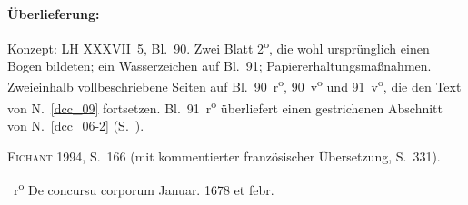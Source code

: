 %
%
%
%
%
\frenchspacing%
%
\begin{ledgroupsized}[r]{120mm}%
\footnotesize%
\pstart%
\noindent%
\textbf{Überlieferung:}%
\pend%
\end{ledgroupsized}%
\begin{ledgroupsized}[r]{114mm}%
\footnotesize%
\pstart%
\parindent -6mm%
%
Konzept:
LH XXXVII~5, Bl.~90.
Zwei Blatt 2\textsuperscript{o},
die wohl ursprünglich einen Bogen bildeten;
ein Wasserzeichen auf Bl.~91;
Papiererhaltungsmaßnahmen.
Zweieinhalb vollbeschriebene Seiten auf Bl.~90~r\textsuperscript{o}, 90~v\textsuperscript{o} und 91~v\textsuperscript{o},
die den Text von N.~\ref{dcc_09} %
fortsetzen.
Bl.~91~r\textsuperscript{o} überliefert einen gestrichenen Abschnitt von N.~\ref{dcc_06-2} %
(S.~\pageref{LH_37_05_091r_gestrtab}\textendash\pageref{LH_37_05_091r_ende}).
\pend%
\end{ledgroupsized}%
%
\begin{ledgroupsized}[r]{114mm}%
\footnotesize%
\pstart%
\parindent -6mm%
%
\textsc{Fichant} 1994, S.~166
(mit kommentierter französischer Übersetzung, S.~331).%
\cite{01056}%
\pend%
\end{ledgroupsized}%
%
%
\frenchspacing%
%
%
\vspace{8mm}
\count{}%
\count{}%
\count{}
\normalsize%
\pstart%
\noindent%
%
~r\textsuperscript{o}\rbrack%
\hspace{39mm}
De concursu corporum%
\protect{}
\hspace{16mm}
Januar. 1678 et febr.%
